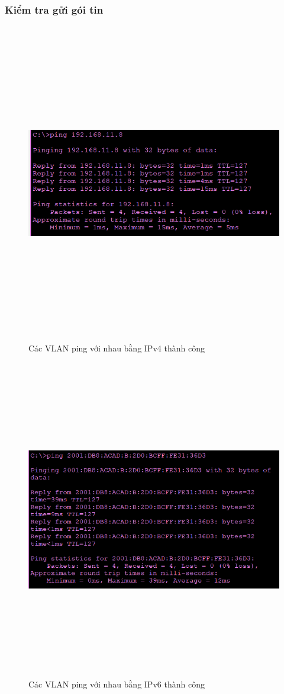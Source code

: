 \documentclass[a4paper, 12pt]{article}
\begin{document}
\subsubsection{Kiểm tra gửi gói tin}
\begin{figure}[H]
    \centering
    \includegraphics[width=16cm, height=14cm]{img/4.13.1c.png}
    \caption{Các VLAN ping với nhau bằng IPv4 thành công }
    \label{hinh4131c}
\end{figure}

\begin{figure}[H]
    \centering
    \includegraphics[width=16cm, height=14cm]{img/4.13.1d.png}
    \caption{Các VLAN ping với nhau bằng IPv6 thành công }
    \label{hinh4131d}
\end{figure}
\end{document}
